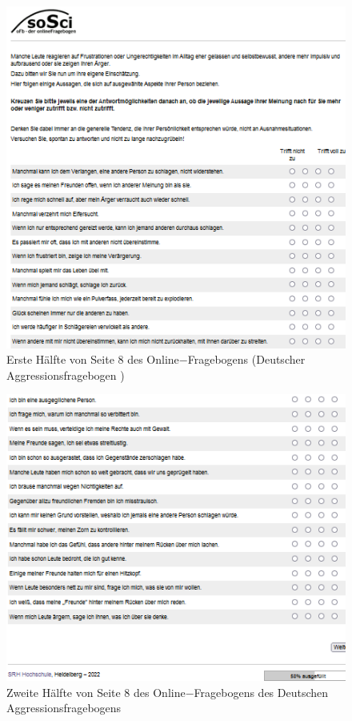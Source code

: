 \begin{appendices}
    \begin{figure}[htb!]
        \centering
            \includegraphics[width=\textwidth, frame]{Seite 8_1.png}
            \caption[]{Erste Hälfte von Seite 8 des Online$-$Fragebogens (Deutscher Aggressionsfragebogen \parencite{Aggressionsfragebogen})}
    \end{figure}
    
    \newpage
    \begin{figure}[htb!]
        \centering
            \includegraphics[width=\textwidth, frame]{Seite 8_2.png}
            \caption[]{Zweite Hälfte von Seite 8 des Online$-$Fragebogens des Deutschen Aggressionsfragebogens \parencite{Aggressionsfragebogen}}
    \end{figure}
    

\end{appendices}

